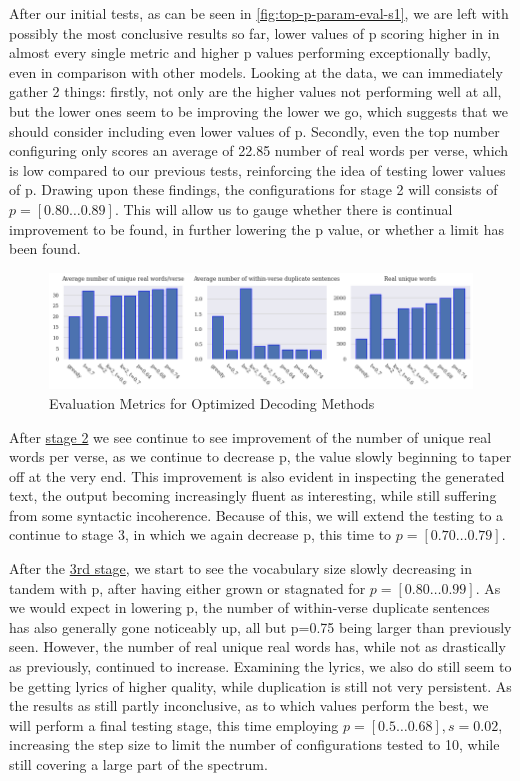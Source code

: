 After our initial tests, as can be seen in \cref{fig:top-p-param-eval-s1}, we are left with possibly the most conclusive results so far, lower values of p scoring higher in in almost every single metric and higher p values performing exceptionally badly, even in comparison with other models. Looking at the data, we can immediately gather 2 things: firstly, not only are the higher values not performing well at all, but the lower ones seem to be improving the lower we go, which suggests that we should consider including even lower values of p. Secondly, even the top number configuring only scores an average of 22.85 number of real words per verse, which is low compared to our previous tests, reinforcing the idea of testing lower values of p. Drawing upon these findings, the configurations for stage 2 will consists of $p=[0.80 \ldots 0.89]$. This will allow us to gauge whether there is continual improvement to be found, in further lowering the p value, or whether a limit has been found.

\begin{figure}[ht!]
    \includegraphics[width=\textwidth, keepaspectratio=true]{figures/combined_param_eval.png}
    \caption{Evaluation Metrics for Optimized Decoding Methods}
    \label{fig:combined-param-eval}
\end{figure}

After \hyperref[fig:top-p-param-eval-s2]{stage 2} we see continue to see improvement of the number of unique real words per verse, as we continue to decrease p, the value slowly beginning to taper off at the very end. This improvement is also evident in inspecting the generated text, the output becoming increasingly fluent as interesting, while still suffering from some syntactic incoherence. Because of this, we will extend the testing to a continue to stage 3, in which we again decrease p, this time to $p=[0.70 \ldots 0.79]$.

After the \hyperref[fig:top-p-param-eval-s3]{3rd stage}, we start to see the vocabulary size slowly decreasing in tandem with p, after having either grown or stagnated for $p=[0.80 \ldots 0.99]$. As we would expect in lowering p, the number of within-verse duplicate sentences has also generally gone noticeably up, all but p=0.75 being larger than previously seen. However, the number of real unique real words has, while not as drastically as previously, continued to increase. Examining the lyrics, we also do still seem to be getting lyrics of higher quality, while duplication is still not very persistent. As the results as still partly inconclusive, as to which values perform the best, we will perform a final testing stage, this time employing $p=[0.5 \ldots 0.68],s=0.02$, increasing the step size to limit the number of configurations tested to 10, while still covering a large part of the spectrum.

